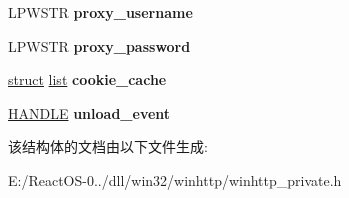 \begin{DoxyCompactItemize}
L\+P\+W\+S\+TR {\bfseries proxy\+\_\+username}
\item 
\mbox{\label{structsession__t_ab1fa2df384fba580dccc627aed58c2d8}} 
L\+P\+W\+S\+TR {\bfseries proxy\+\_\+password}
\item 
\mbox{\label{structsession__t_ad18194b5f2619503c5eb2289077151e5}} 
\hyperlink{interfacestruct}{struct} \hyperlink{classlist}{list} {\bfseries cookie\+\_\+cache}
\item 
\mbox{\label{structsession__t_a225515a4e26bd851e1194f02f3097e34}} 
\hyperlink{interfacevoid}{H\+A\+N\+D\+LE} {\bfseries unload\+\_\+event}
\end{DoxyCompactItemize}


该结构体的文档由以下文件生成\+:\begin{DoxyCompactItemize}
\item 
E\+:/\+React\+O\+S-\/0../dll/win32/winhttp/winhttp\+\_\+private.\+h\end{DoxyCompactItemize}
